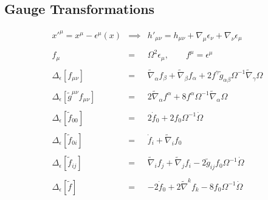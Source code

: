 \documentclass[10pt,letterpaper]{article}
\numberwithin{equation}{section}
\begin{document}
\begin{appendices}
	\section{Gauge Transformations}
	\begin{eqnarray}
	x'^\mu = x^\mu - \epsilon^\mu(x) &\implies&  h'_{\mu\nu} = h_{\mu\nu} + \nabla_\mu \epsilon_\nu + \nabla_\nu \epsilon_\mu
	\label{gaugetrans}
	\\ \nonumber\\
	f_{\mu} &=& \Omega^2 \epsilon_\mu,\qquad f^\mu = \epsilon^\mu
	\\ \nonumber\\
	\Delta_\epsilon\left[ f_{\mu\nu} \right]  &=& \tilde\nabla_{\alpha }f_{\beta } + \tilde\nabla_{\beta }f_{\alpha } + 2 f^{\gamma } \tilde g_{\alpha \beta } \Omega^{-1} \tilde\nabla_{\gamma }\Omega 
	\\ \nonumber\\
	\Delta_\epsilon\left[ \tilde g^{\mu\nu} f_{\mu\nu} \right] &=&   
	2 \tilde{\nabla}_{\alpha }f^{\alpha } + 8 f^{\alpha } \Omega^{-1} \tilde{\nabla}_{\alpha }\Omega 
	\\ \nonumber\\
	\Delta_\epsilon\left[ \tilde f_{00} \right] &=&  2\dot f_0 + 2f_0 \Omega^{-1}\dot \Omega
	\\ \nonumber\\
	\Delta_\epsilon\left[ \tilde f_{0i} \right]  &=&  \dot f_i + \tilde\nabla_i f_0
	\\ \nonumber\\
	\Delta_\epsilon\left[ \tilde f_{ij}  \right]  &=& \tilde\nabla_{i }f_{j } + \tilde\nabla_{j}f_{i} - 2\tilde g_{ij} f_0 \Omega^{-1}\dot \Omega
	\\ \nonumber\\
	\Delta_\epsilon\left[ \tilde f \right]  &=&  -2\dot f_0 + 2\tilde\nabla^k f_k -8 f_0 \Omega^{-1}\dot \Omega
	\end{eqnarray}
\end{appendices}
\end{document}
